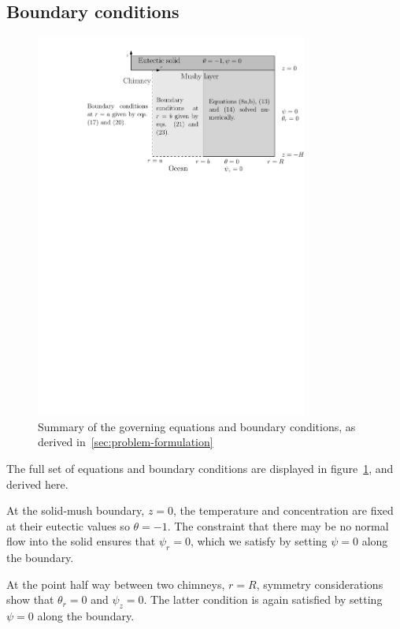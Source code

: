 \documentclass[11pt]{proc}
\begin{document}
\subsection{Boundary conditions}
\begin{figure}[ht!]
    \centering
       \includegraphics[width=0.8\textwidth]{boundary-conditions}
       \caption{Summary of the governing equations and boundary conditions, as derived in~\autoref{sec:problem-formulation}}
    \label{fig:boundary-conditions}
\end{figure}


The full set of equations and boundary conditions are displayed in figure~\ref{fig:boundary-conditions}, and derived here.

At the solid-mush boundary, $z=0$, the temperature and concentration are fixed at their eutectic values so $\theta = -1$. The constraint that there may be no normal flow into the solid ensures that $\psi_r = 0$, which we satisfy by setting $\psi = 0$ along the boundary.

At the point half way between two chimneys, $r=R$, symmetry considerations show that $\theta_r =0$ and $\psi_z=0$. The latter condition is again satisfied by setting $\psi = 0$ along the boundary.
\end{document}
